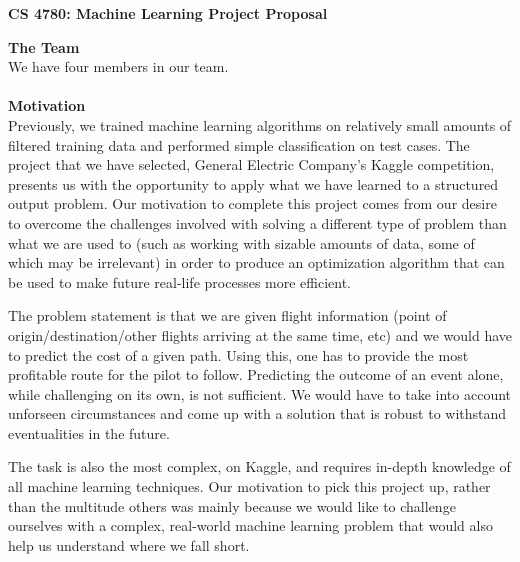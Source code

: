 \documentclass{article}[9pt]
\begin{document}
\begin{framed}
\noindent
\large{\textbf{CS 4780: Machine Learning \hfill Project Proposal}}
\end{framed}

\noindent\Large{\textbf{The Team}}\\
\noindent We have four members in our team.\\\\
\noindent\Large{\textbf{Motivation}}\\
\noindent Previously, we trained machine learning algorithms on relatively small amounts of filtered training data and performed simple classification on test cases. The project that we have selected, General Electric Company's Kaggle competition, presents us with the opportunity to apply what we have learned to a structured output problem. Our motivation to complete this project comes from our desire to overcome the challenges involved with solving a different type of problem than what we are used to (such as working with sizable amounts of data, some of which may be irrelevant) in order to produce an optimization algorithm that can be used to make future real-life processes more efficient.

The problem statement is that we are given flight information (point of origin/destination/other flights arriving at the same time, etc) and we would have to predict the cost of a given path. Using this, one has to provide the most profitable route for the pilot to follow. Predicting the outcome of an event alone, while challenging on its own, is not sufficient. We would have to take into account unforseen circumstances and come up with a solution that is robust to withstand eventualities in the future.

The task is also the most complex, on Kaggle, and requires in-depth knowledge of all machine learning techniques. Our motivation to pick this project up, rather than the multitude others was mainly because we would like to challenge ourselves with a complex, real-world machine learning problem that would also help us understand where we fall short.
\end{document}

